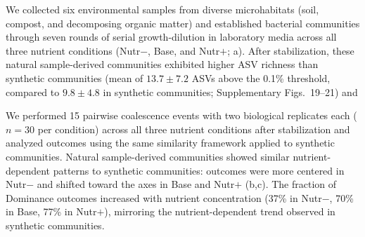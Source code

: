 We collected six environmental samples from diverse microhabitats (soil, compost, and decomposing organic matter) and established bacterial communities through seven rounds of serial growth-dilution in laboratory media across all three nutrient conditions (Nutr$-$, Base, and Nutr$+$; a). After stabilization, these natural sample-derived communities exhibited higher ASV richness than synthetic communities (mean of $13.7 \pm 7.2$ ASVs above the 0.1\% threshold, compared to $9.8 \pm 4.8$ in synthetic communities; Supplementary Figs.~19--21) and 

We performed 15 pairwise coalescence events with two biological replicates each ($n = 30$ per condition) across all three nutrient conditions after stabilization and analyzed outcomes using the same similarity framework applied to synthetic communities. Natural sample-derived communities showed similar nutrient-dependent patterns to synthetic communities: outcomes were more centered in Nutr$-$ and shifted toward the axes in Base and Nutr$+$ (b,c). The fraction of Dominance outcomes increased with nutrient concentration (37\% in Nutr$-$, 70\% in Base, 77\% in Nutr$+$), mirroring the nutrient-dependent trend observed in synthetic communities. 
